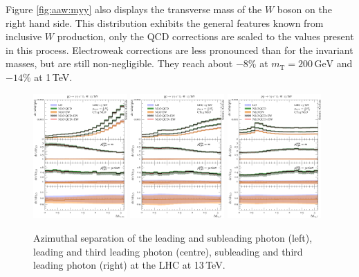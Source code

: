 Figure \ref{fig:aaw:myy} also displays the transverse 
mass of the $W$ boson on the right hand side. 
This distribution exhibits the general features known 
from inclusive $W$ production, only the QCD corrections 
are scaled to the values present in this process.
Electroweak corrections are less pronounced than for 
the invariant masses, but are still non-negligible. 
They reach about $-8\%$ at $m_\text{T}=200\,\text{GeV}$ 
and $-14\%$ at 1\,TeV.

\begin{figure}[t!]
  \centering
  \includegraphics[width=0.32\textwidth]{figs_aaw/dphi_y1_y2}
  \includegraphics[width=0.32\textwidth]{figs_aaw/dphi_y1_l1}
  \includegraphics[width=0.32\textwidth]{figs_aaw/dphi_y2_l1}
  \caption{
    Azimuthal separation of the leading and subleading photon (left),
    leading and third leading photon (centre), subleading and third leading 
    photon (right) at the LHC at 13\,TeV.
    \label{fig:aaw:dphi}
  }
\end{figure}

